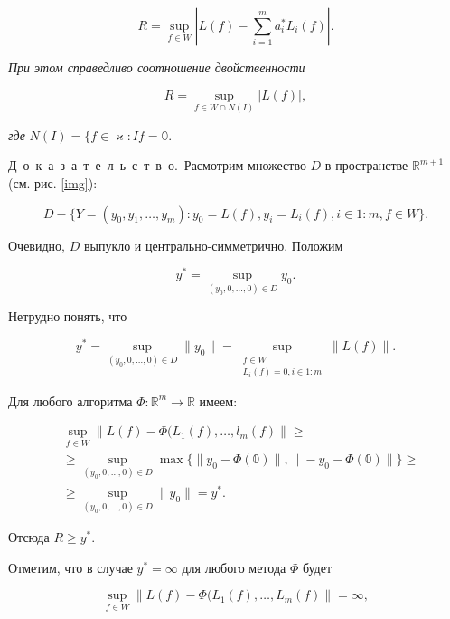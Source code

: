 \documentclass{book}
\newcommand{\proof}{Д~о~к~а~з~а~т~е~л~ь~с~т~в~о.\ }
\begin{document}
\begin{equation*}
R=\sup_{f\in W}\left|L(f)-\sum_{i=1}^ma_i^*L_i(f)\right|.
\end{equation*}

\noindent\textit{При этом справедливо соотношение двойственности}

\begin{equation*}
R=\sup_{f\in W\cap N(I)}|L(f)|,
\end{equation*}

\noindent\textit{где} $N(I)=\{f\in\varkappa:If=\mathbb{0}$.
\par\proof Расмотрим множество $D$ в пространстве $\mathbb{R}^{m+1}$ (см. рис. {\ref{img}}):

\begin{equation*}
D-\{Y=(y_0, y_1, \dots, y_m):y_0=L(f), y_i=L_i(f), i\in1:m, f\in W\}.
\end{equation*}

\noindent Очевидно, $D$ выпукло и центрально-симметрично. Положим

\begin{equation*}
y^*=\sup_{(y_0, 0, \dots, 0)\in D}y_0.
\end{equation*}

\noindent Нетрудно понять, что

\begin{equation*}
y^*=\sup_{(y_0, 0, \dots, 0)\in D}\|y_0\|=\sup_{\substack{f\in W\\ L_i(f)=0, i\in1:m}}\|L(f)\|.
\end{equation*}

\noindent Для любого алгоритма $\Phi:\mathbb{R}^m\rightarrow\mathbb{R}$ имеем:

\begin{equation*}
\begin{split}
&\sup_{f\in W}\|L(f)-\Phi(L_1(f), \dots, l_m(f)\|\geq\\
&\geq\sup_{(y_0, 0, \dots, 0)\in D}\max\{\|y_0-\Phi(\mathbb{0})\|, \|-y_0-\Phi(\mathbb{0})\|\}\geq\\
&\geq\sup_{(y_0, 0, \dots, 0)\in D}\|y_0\|=y^*.
\end{split}
\end{equation*}

\noindent Отсюда $R\geq y^*$.
\par Отметим, что в случае $y^*=\infty$ для любого метода $\Phi$ будет

\begin{equation*}
\sup_{f\in W}\|L(f)-\Phi(L_1(f), \dots, L_m(f)\|=\infty,
\end{equation*}
\end{document}
